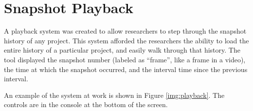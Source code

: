 

\section{Snapshot Playback}
\label{sec:playback}

A playback system was created to allow researchers to step through the snapshot history of any project. This system afforded the researchers the ability to load the entire history of a particular project, and easily walk through that history. The tool displayed the snapshot number (labeled as ``frame'', like a frame in a video), the time at which the snapshot occurred, and the interval time since the previous interval. 

An example of the system at work is shown in Figure \ref{img:playback}. The controls are in the console at the bottom of the screen.


